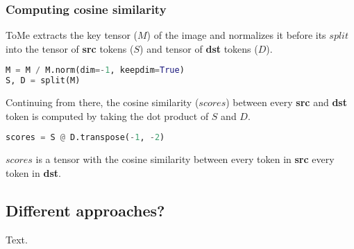 \subsubsection*{Computing cosine similarity}
ToMe extracts the key tensor (\(M\)) of the image and normalizes it before its \(split\) into the tensor of \textbf{src} tokens (\(S\)) and tensor of \textbf{dst} tokens (\(D\)).
\begin{lstlisting}[language=Python]
M = M / M.norm(dim=-1, keepdim=True)
S, D = split(M)
\end{lstlisting}
Continuing from there, the cosine similarity (\(scores\)) between every \textbf{src} and \textbf{dst} token is computed by taking the dot product of \(S\) and \(D\).
\begin{lstlisting}[language=Python]
scores = S @ D.transpose(-1, -2)
\end{lstlisting}
\(scores\) is a tensor with the cosine similarity between every token in \textbf{src} every token in \textbf{dst}.

\subsection{Different approaches?}
Text.

